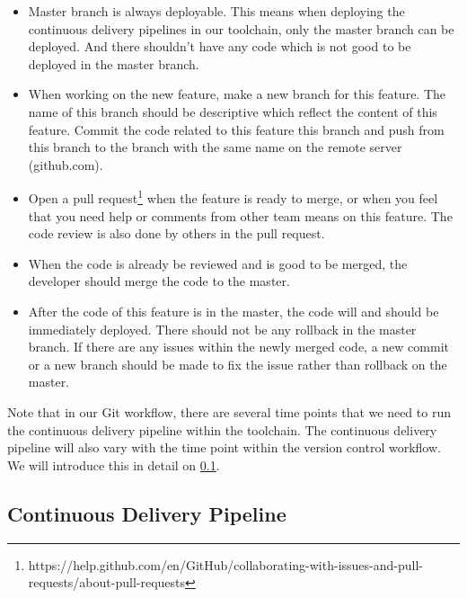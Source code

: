 \begin{itemize}
    \item Master branch is always deployable. This means when deploying the continuous delivery pipelines in our toolchain, only the master branch can be deployed. And there shouldn't have any code which is not good to be deployed in the master branch. 
    \item When working on the new feature, make a new branch for this feature. The name of this branch should be descriptive which reflect the content of this feature. Commit the code related to this feature this branch and push from this branch to the branch with the same name on the remote server (github.com).
    \item Open a pull request\footnote{https://help.github.com/en/GitHub/collaborating-with-issues-and-pull-requests/about-pull-requests} when the feature is ready to merge, or when you feel that you need help or comments from other team means on this feature. The code review is also done by others in the pull request.
    \item When the code is already be reviewed and is good to be merged, the developer should merge the code to the master.
    \item After the code of this feature is in the master, the code will and should be immediately deployed. There should not be any rollback in the master branch. If there are any issues within the newly merged code, a new commit or a new branch should be made to fix the issue rather than rollback on the master.
\end{itemize}
\par
Note that in our Git workflow, there are several time points that we need to run the continuous delivery pipeline within the toolchain. The continuous delivery pipeline will also vary with the time point within the version control workflow. We will introduce this in detail on \ref{our-ci}.
\subsection{Continuous Delivery Pipeline}
\label{our-ci}
